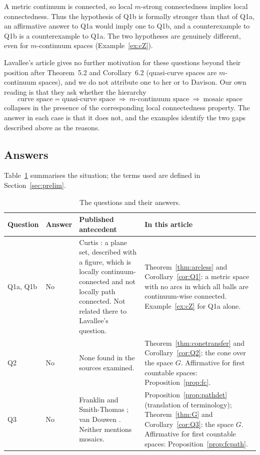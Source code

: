 \documentclass[11pt]{amsart}
\theoremstyle{definition}
\theoremstyle{remark}
\numberwithin{equation}{section}
\begin{document}
A metric continuum is connected, so local $m$-strong connectedness implies local connectedness. Thus the hypothesis of Q1b is formally stronger than that of Q1a, an affirmative answer to Q1a would imply one to Q1b, and a counterexample to Q1b is a counterexample to Q1a. The two hypotheses are genuinely different, even for $m$-continuum spaces (Example~\ref{ex:cZ}).

Lavallee's article gives no further motivation for these questions beyond their position after Theorem~5.2 and Corollary~6.2 (quasi-curve spaces are $m$-continuum spaces), and we do not attribute one to her or to Davison. Our own reading is that they ask whether the hierarchy
\[\text{curve space}=\text{quasi-curve space}\ \Longrightarrow\ \text{$m$-continuum space}\ \Longrightarrow\ \text{mosaic space}\]
collapses in the presence of the corresponding local connectedness property. The answer in each case is that it does not, and the examples identify the two gaps described above as the reasons.

\subsection{Answers}
Table~\ref{tab:answers} summarises the situation; the terms used are defined in Section~\ref{sec:prelim}.

\begin{table}[ht]
\renewcommand{\arraystretch}{1.25}
\small\setlength{\tabcolsep}{4pt}\begin{tabular}{@{}p{}p{}p{}p{}@{}}
\toprule
Question & Answer & Published antecedent & In this article\\
\midrule
Q1a, Q1b & No & Curtis \cite[Example~1.8]{curtis80}: a plane set, described with a figure, which is locally continuum-connected and not locally path connected. Not related there to Lavallee's question. & Theorem~\ref{thm:arcless} and Corollary~\ref{cor:Q1}: a metric space with no arcs in which all balls are continuum-wise connected. Example~\ref{ex:cZ} for Q1a alone.\\
Q2 & No & None found in the sources examined. & Theorem~\ref{thm:conetransfer} and Corollary~\ref{cor:Q2}: the cone over the space $G$. Affirmative for first countable spaces: Proposition~\ref{prop:fc}.\\
Q3 & No & Franklin and Smith-Thomas \cite[Section~3]{fst79}; van Douwen \cite{vandouwen81}. Neither mentions mosaics. & Proposition~\ref{prop:pathdet} (translation of terminology); Theorem~\ref{thm:G} and Corollary~\ref{cor:Q3}: the space $G$. Affirmative for first countable spaces: Proposition~\ref{prop:fcpath}.\\
\bottomrule
\end{tabular}
\caption{The questions and their answers.}\label{tab:answers}
\end{table}
\end{document}
